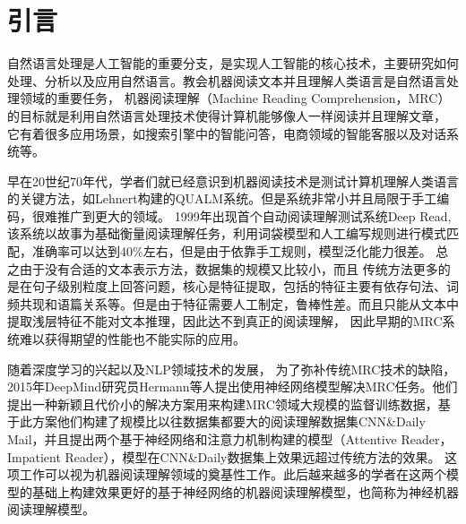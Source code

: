 \section{引言}


自然语言处理是人工智能的重要分支，是实现人工智能的核心技术，主要研究如何处理、分析以及应用自然语言。教会机器阅读文本并且理解人类语言是自然语言处理领域的重要任务，
机器阅读理解（Machine Reading Comprehension，MRC）的目标就是利用自然语言处理技术使得计算机能够像人一样阅读并且理解文章，
它有着很多应用场景，如搜索引擎中的智能问答，电商领域的智能客服以及对话系统等。

早在20世纪70年代，学者们就已经意识到机器阅读技术是测试计算机理解人类语言的关键方法，如Lehnert构建的QUALM系统。但是系统非常小并且局限于手工编码，很难推广到更大的领域。
1999年出现首个自动阅读理解测试系统Deep Read,该系统以故事为基础衡量阅读理解任务，利用词袋模型和人工编写规则进行模式匹配，准确率可以达到40\%左右，但是由于依靠手工规则，模型泛化能力很差。
总之由于没有合适的文本表示方法，数据集的规模又比较小，而且
传统方法更多的是在句子级别粒度上回答问题，核心是特征提取，包括的特征主要有依存句法、词频共现和语篇关系等。但是由于特征需要人工制定，鲁棒性差。而且只能从文本中提取浅层特征不能对文本推理，因此达不到真正的阅读理解，
因此早期的MRC系统难以获得期望的性能也不能实际的应用。

随着深度学习的兴起以及NLP领域技术的发展，
为了弥补传统MRC技术的缺陷，2015年DeepMind研究员Hermann等人提出使用神经网络模型解决MRC任务。他们提出一种新颖且代价小的解决方案用来构建MRC领域大规模的监督训练数据，基于此方案他们构建了规模比以往数据集都要大的阅读理解数据集CNN\&Daily Mail，并且提出两个基于神经网络和注意力机制构建的模型（Attentive Reader，Impatient Reader），模型在CNN\&Daily数据集上效果远超过传统方法的效果。
这项工作可以视为机器阅读理解领域的奠基性工作。此后越来越多的学者在这两个模型的基础上构建效果更好的基于神经网络的机器阅读理解模型，也简称为神经机器阅读理解模型。

